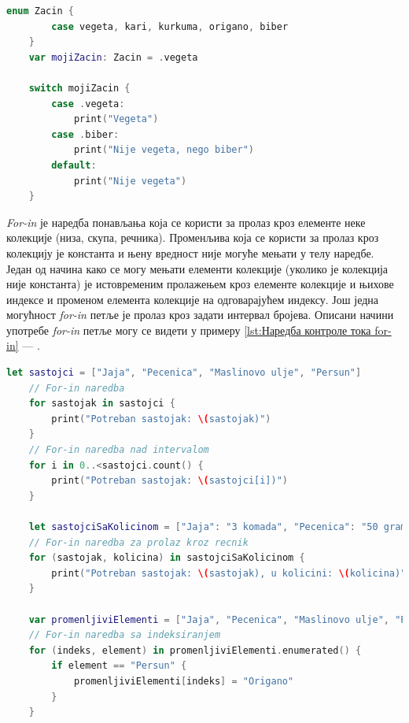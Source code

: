\documentclass[12pt,oneside]{memoir}
\begin{document}
\begin{lstlisting}[caption=\textit{{Наредба контроле тока switch}}, label={lst:Наредба контроле тока switch}, language=Swift, frame=single]
    enum Zacin {
        case vegeta, kari, kurkuma, origano, biber
    }
    var mojiZacin: Zacin = .vegeta
    
    switch mojiZacin {
        case .vegeta:
            print("Vegeta")
        case .biber:
            print("Nije vegeta, nego biber")
        default:
            print("Nije vegeta")
    }
\end{lstlisting}

\indent \textit{For-in} је наредба понављања која се користи за пролаз кроз елементе неке колекције (низа, скупа, речника). Променљива која се користи за пролаз кроз колекцију је константа и њену вредност није могуће мењати у телу наредбе. Један од начина како се могу мењати елементи колекције (уколико је колекција није константа) је истовременим пролажењем кроз елементе колекције и њихове индексе и променом елемента колекције на одговарајућем индексу. Још једна могућност \textit{for-in} петље је пролаз кроз задати интервал бројева. Описани начини употребе \textit{for-in} петље могу се видети у примеру \ref{lst:Наредба контроле тока for-in} --- .
\begin{lstlisting}[caption=\textit{{Наредба контроле тока for-in}}, label={lst:Наредба контроле тока for-in}, language=Swift, frame=single]
    let sastojci = ["Jaja", "Pecenica", "Maslinovo ulje", "Persun"]
    // For-in naredba
    for sastojak in sastojci {
        print("Potreban sastojak: \(sastojak)")
    }
    // For-in naredba nad intervalom
    for i in 0..<sastojci.count() {
        print("Potreban sastojak: \(sastojci[i])")
    }
    
    let sastojciSaKolicinom = ["Jaja": "3 komada", "Pecenica": "50 grama", "Maslinovo ulje": "Koliko je potrebno da pokrije tiganj", "Persun": "Prstohvat"]
    // For-in naredba za prolaz kroz recnik
    for (sastojak, kolicina) in sastojciSaKolicinom {
        print("Potreban sastojak: \(sastojak), u kolicini: \(kolicina)")
    }
    
    var promenljiviElementi = ["Jaja", "Pecenica", "Maslinovo ulje", "Persun"]
    // For-in naredba sa indeksiranjem
    for (indeks, element) in promenljiviElementi.enumerated() {
        if element == "Persun" {
            promenljiviElementi[indeks] = "Origano"
        }
    } 
\end{lstlisting}
\end{document}
